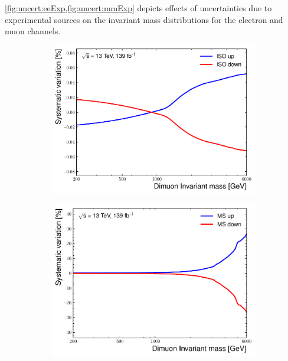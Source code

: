 \cref{fig:uncert:eeExp,fig:uncert:mmExp} depicts effects of uncertainties due to experimental sources on the invariant mass distributions for the electron and muon channels. 

\begin{figure}[]
    \centering
    \begin{subfigure}[b]{0.42\textwidth}
        \centering
        \includegraphics[width=\textwidth]{figures/analysis/datamc/Uncertainties/exp/mm/m_uu_pstOR_MUON_EFF_ISO_SYS__1up.pdf}
        \label{fig:uncert:mmIso}
    \end{subfigure}
    \begin{subfigure}[b]{0.42\textwidth}
        \centering
        \includegraphics[width=\textwidth]{figures/analysis/datamc/Uncertainties/exp/mm/m_uu_pstOR_MUON_MS__1up.pdf}

\end{subfigure}
\end{figure}
